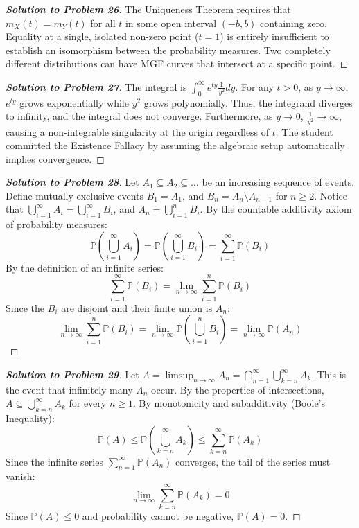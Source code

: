 \documentclass[11pt, a4paper]{article}
\theoremstyle{definition}
\theoremstyle{remark}
\newcommand{\Prob}{\mathbb{P}}
\begin{document}
\begin{proof}[\textbf{Solution to Problem 26}]
The Uniqueness Theorem requires that $m_X(t) = m_Y(t)$ for all $t$ in some open interval $(-b, b)$ containing zero.
Equality at a single, isolated non-zero point ($t=1$) is entirely insufficient to establish an isomorphism between the probability measures. Two completely different distributions can have MGF curves that intersect at a specific point.
\end{proof}

\begin{proof}[\textbf{Solution to Problem 27}]
The integral is $\int_0^\infty e^{ty} \frac{1}{y^2} dy$.
For any $t > 0$, as $y \to \infty$, $e^{ty}$ grows exponentially while $y^2$ grows polynomially. Thus, the integrand diverges to infinity, and the integral does not converge.
Furthermore, as $y \to 0$, $\frac{1}{y^2} \to \infty$, causing a non-integrable singularity at the origin regardless of $t$. The student committed the Existence Fallacy by assuming the algebraic setup automatically implies convergence.
\end{proof}

\begin{proof}[\textbf{Solution to Problem 28}]
Let $A_1 \subseteq A_2 \subseteq \dots$ be an increasing sequence of events.
Define mutually exclusive events $B_1 = A_1$, and $B_n = A_n \setminus A_{n-1}$ for $n \ge 2$.
Notice that $\bigcup_{i=1}^\infty A_i = \bigcup_{i=1}^\infty B_i$, and $A_n = \bigcup_{i=1}^n B_i$.
By the countable additivity axiom of probability measures:
\[ \Prob\left(\bigcup_{i=1}^\infty A_i\right) = \Prob\left(\bigcup_{i=1}^\infty B_i\right) = \sum_{i=1}^\infty \Prob(B_i) \]
By the definition of an infinite series:
\[ \sum_{i=1}^\infty \Prob(B_i) = \lim_{n \to \infty} \sum_{i=1}^n \Prob(B_i) \]
Since the $B_i$ are disjoint and their finite union is $A_n$:
\[ \lim_{n \to \infty} \sum_{i=1}^n \Prob(B_i) = \lim_{n \to \infty} \Prob\left(\bigcup_{i=1}^n B_i\right) = \lim_{n \to \infty} \Prob(A_n) \]
\end{proof}

\begin{proof}[\textbf{Solution to Problem 29}]
Let $A = \limsup_{n \to \infty} A_n = \bigcap_{n=1}^\infty \bigcup_{k=n}^\infty A_k$. This is the event that infinitely many $A_n$ occur.
By the properties of intersections, $A \subseteq \bigcup_{k=n}^\infty A_k$ for every $n \ge 1$.
By monotonicity and subadditivity (Boole's Inequality):
\[ \Prob(A) \le \Prob\left(\bigcup_{k=n}^\infty A_k\right) \le \sum_{k=n}^\infty \Prob(A_k) \]
Since the infinite series $\sum_{n=1}^\infty \Prob(A_n)$ converges, the tail of the series must vanish:
\[ \lim_{n \to \infty} \sum_{k=n}^\infty \Prob(A_k) = 0 \]
Since $\Prob(A) \le 0$ and probability cannot be negative, $\Prob(A) = 0$.
\end{proof}
\end{document}
